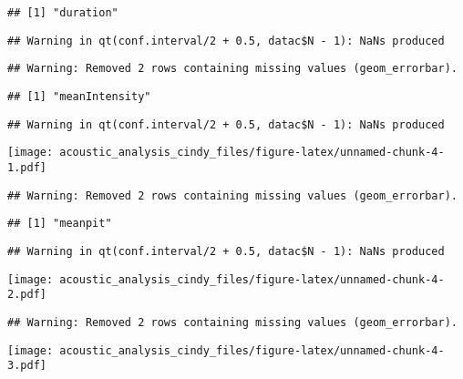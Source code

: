 \documentclass[]{article}
\begin{document}
\begin{verbatim}
## [1] "duration"
\end{verbatim}

\begin{verbatim}
## Warning in qt(conf.interval/2 + 0.5, datac$N - 1): NaNs produced
\end{verbatim}

\begin{verbatim}
## Warning: Removed 2 rows containing missing values (geom_errorbar).
\end{verbatim}

\begin{verbatim}
## [1] "meanIntensity"
\end{verbatim}

\begin{verbatim}
## Warning in qt(conf.interval/2 + 0.5, datac$N - 1): NaNs produced
\end{verbatim}

\texttt{[image: acoustic\_analysis\_cindy\_files/figure-latex/unnamed-chunk-4-1.pdf]}

\begin{verbatim}
## Warning: Removed 2 rows containing missing values (geom_errorbar).
\end{verbatim}

\begin{verbatim}
## [1] "meanpit"
\end{verbatim}

\begin{verbatim}
## Warning in qt(conf.interval/2 + 0.5, datac$N - 1): NaNs produced
\end{verbatim}

\texttt{[image: acoustic\_analysis\_cindy\_files/figure-latex/unnamed-chunk-4-2.pdf]}

\begin{verbatim}
## Warning: Removed 2 rows containing missing values (geom_errorbar).
\end{verbatim}

\texttt{[image: acoustic\_analysis\_cindy\_files/figure-latex/unnamed-chunk-4-3.pdf]}
\end{document}
